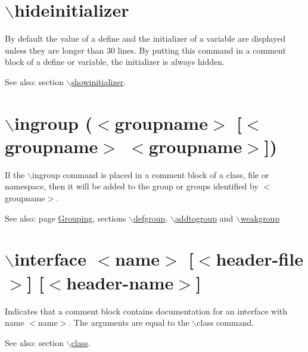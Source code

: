  \hypertarget{commands_cmdhideinitializer}{}\section{$\backslash$hideinitializer}\label{commands_cmdhideinitializer}
 By default the value of a define and the initializer of a variable are displayed unless they are longer than 30 lines. By putting this command in a comment block of a define or variable, the initializer is always hidden.

\begin{Desc}
\item[See also:]section \hyperlink{commands_cmdshowinitializer}{$\backslash$showinitializer}.\end{Desc}


 \hypertarget{commands_cmdingroup}{}\section{$\backslash$ingroup ($<$groupname$>$ \mbox{[}$<$groupname$>$ $<$groupname$>$\mbox{]})}\label{commands_cmdingroup}
 If the $\backslash$ingroup command is placed in a comment block of a class, file or namespace, then it will be added to the group or groups identified by $<$groupname$>$.

\begin{Desc}
\item[See also:]page \hyperlink{grouping}{Grouping}, sections \hyperlink{commands_cmddefgroup}{$\backslash$defgroup}, \hyperlink{commands_cmdaddtogroup}{$\backslash$addtogroup} and \hyperlink{commands_cmdweakgroup}{$\backslash$weakgroup}\end{Desc}


 \hypertarget{commands_cmdinterface}{}\section{$\backslash$interface $<$name$>$ \mbox{[}$<$header-file$>$\mbox{]} \mbox{[}$<$header-name$>$\mbox{]}}\label{commands_cmdinterface}
 Indicates that a comment block contains documentation for an interface with name $<$name$>$. The arguments are equal to the $\backslash$class command.

\begin{Desc}
\item[See also:]section \hyperlink{commands_cmdclass}{$\backslash$class}.\end{Desc}


